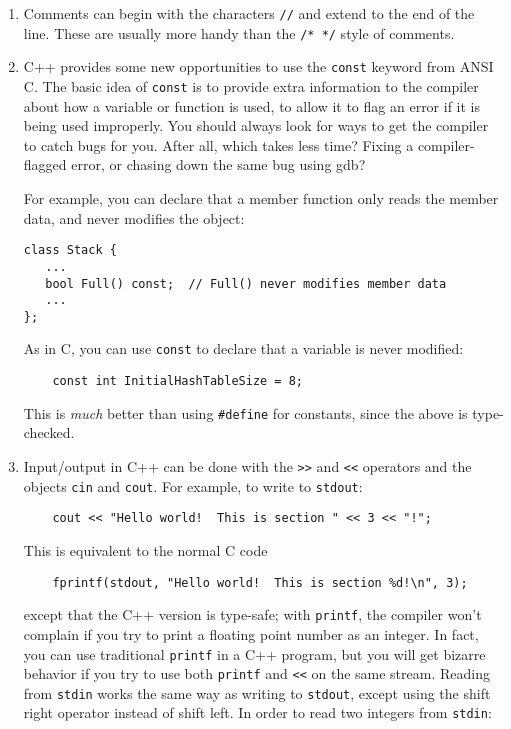 \begin{enumerate}
\item Comments can begin with the characters \verb+//+ and extend to
the end of the line.  These are usually more handy than the
\verb+/* */+ style of comments.

\item C++ provides some new opportunities to use the
{\tt const} keyword from ANSI C.  The basic idea of {\tt const}
is to provide extra information to the compiler about how a variable
or function is used, to allow it to flag an error if it is being
used improperly.  You should always look for ways to get the compiler
to catch bugs for you.  After all, which takes less time?  Fixing
a compiler-flagged error, or chasing down the same bug using gdb?

For example, you can declare that a member function only reads the
member data, and never modifies the object:

\begin{verbatim}
class Stack {
   ...
   bool Full() const;  // Full() never modifies member data
   ...
};
\end{verbatim}

As in C, you can use {\tt const} to declare that a variable is never
modified:

\begin{verbatim}
    const int InitialHashTableSize = 8;
\end{verbatim}

This is {\em much} better than using {\tt \#define} for constants,
since the above is type-checked.

\item Input/output in C++ can be done with the {\tt >>} and {\tt <<}
operators and the objects {\tt cin} and {\tt cout}.  For example,
to write to {\tt stdout}:

\begin{verbatim}
    cout << "Hello world!  This is section " << 3 << "!";
\end{verbatim}

This is equivalent to the normal C code

\begin{verbatim}
    fprintf(stdout, "Hello world!  This is section %d!\n", 3);
\end{verbatim}

except that the C++ version is type-safe; with {\tt printf}, the
compiler won't complain if you try to print a floating point number
as an integer. In fact, you can use traditional {\tt printf} in a C++
program, but you will get bizarre behavior if you try to use both
{\tt printf} and {\tt <<} on the same stream.  Reading from {\tt stdin}
works the same way as writing to {\tt stdout}, except using the shift
right operator instead of shift left.
In order to read two integers from {\tt stdin}:


\end{enumerate}
